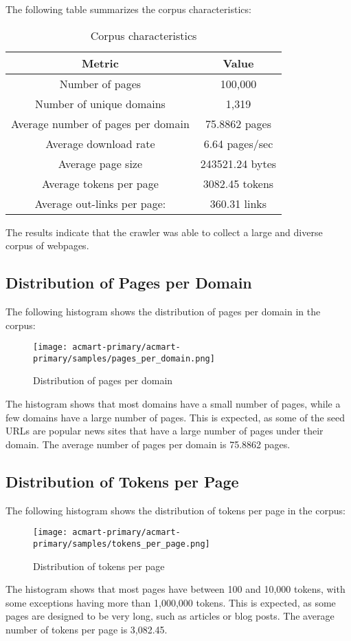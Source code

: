 \documentclass[sigconf]{acmart}
\begin{document}
The following table summarizes the corpus characteristics:
\begin{table}[H]
\centering
\begin{tabular}{|c|c|}
\hline
\textbf{Metric} & \textbf{Value} \\ \hline
Number of pages & 100,000 \\ \hline
Number of unique domains & 1,319 \\ \hline
Average number of pages per domain & 75.8862 pages\\ \hline
Average download rate & 6.64 pages/sec\\ \hline
Average page size & 243521.24 bytes \\ \hline
Average tokens per page & 3082.45 tokens \\ \hline
Average out-links per page: &  360.31 links \\ \hline
\end{tabular}
\caption{Corpus characteristics}
\label{tab:corpus}
\end{table}
The results indicate that the crawler was able to collect a large and diverse corpus of webpages.

\subsection{Distribution of Pages per Domain}
The following histogram shows the distribution of pages per domain in the corpus:
\begin{figure}[h]
\centering
\texttt{[image: acmart-primary/acmart-primary/samples/pages\_per\_domain.png]}
\caption{Distribution of pages per domain}
\label{fig:histogram}
\end{figure}
The histogram shows that most domains have a small number of pages, while a few domains have a large number of pages. This is expected, as some of the seed URLs are popular news sites that have a large number of pages under their domain. The average number of pages per domain is 75.8862 pages.

\subsection{Distribution of Tokens per Page}
The following histogram shows the distribution of tokens per page in the corpus:
\begin{figure}[H]
\centering
\texttt{[image: acmart-primary/acmart-primary/samples/tokens\_per\_page.png]}
\caption{Distribution of tokens per page}
\label{fig:histogram_tokens}
\end{figure}
The histogram shows that most pages have between 100 and 10,000 tokens, with some exceptions having more than 1,000,000 tokens. This is expected, as some pages are designed to be very long, such as articles or blog posts. The average number of tokens per page is 3,082.45.
\end{document}
